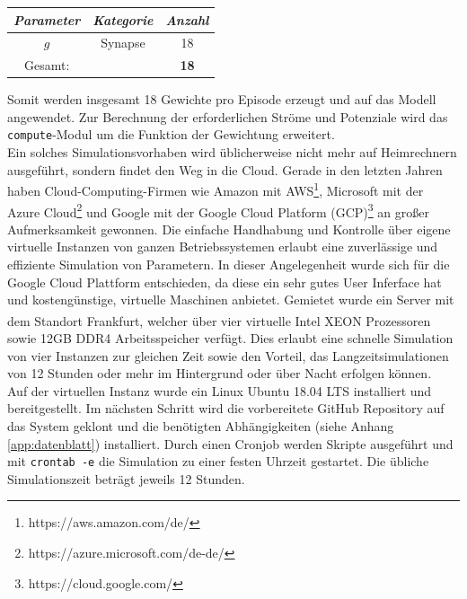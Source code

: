 		\begin{center}
			\begin{tabular}{c@{\hskip 0.5cm}c@{\hskip 0.5cm}c@{\hskip 0.5cm}}    \toprule
				\setlength{\tabcolsep}{50pt}
				\renewcommand{\arraystretch}{1.5}
				\emph{Parameter}	& \emph{Kategorie}  & \emph{Anzahl} \\\midrule
				$g$					& Synapse			& 18			\\\bottomrule
				Gesamt:				&					& \textbf{18}	\\
				\hline
			\end{tabular}
		\end{center}
		Somit werden insgesamt 18 Gewichte pro Episode erzeugt und auf das Modell angewendet. Zur Berechnung der erforderlichen Ströme und Potenziale wird das \texttt{compute}-Modul um die Funktion der Gewichtung erweitert.\\
		Ein solches Simulationsvorhaben wird üblicherweise nicht mehr auf Heimrechnern ausgeführt, sondern findet den Weg in die Cloud. Gerade in den letzten Jahren haben Cloud-Computing-Firmen wie Amazon mit AWS\footnote{https://aws.amazon.com/de/}, Microsoft mit der Azure Cloud\footnote{https://azure.microsoft.com/de-de/} und Google mit der Google Cloud Platform (GCP)\footnote{https://cloud.google.com/} an großer Aufmerksamkeit gewonnen. Die einfache Handhabung und Kontrolle über eigene virtuelle Instanzen von ganzen Betriebssystemen erlaubt eine zuverlässige und effiziente Simulation von Parametern. In dieser Angelegenheit wurde sich für die Google Cloud Plattform entschieden, da diese ein sehr gutes User Inferface hat und kostengünstige, virtuelle Maschinen anbietet. Gemietet wurde ein Server mit dem Standort Frankfurt, welcher über vier virtuelle Intel XEON\textsuperscript{\textregistered} Prozessoren sowie 12GB DDR4 Arbeitsspeicher verfügt. Dies erlaubt eine schnelle Simulation von vier Instanzen zur gleichen Zeit sowie den Vorteil, das Langzeitsimulationen von 12 Stunden oder mehr im Hintergrund oder über Nacht erfolgen können.\\
		Auf der virtuellen Instanz wurde ein Linux Ubuntu 18.04 LTS installiert und bereitgestellt. Im nächsten Schritt wird die vorbereitete GitHub Repository auf das System geklont und die benötigten Abhängigkeiten (siehe Anhang \ref{app:datenblatt}) installiert. Durch einen Cronjob werden Skripte ausgeführt und mit \texttt{crontab -e} die Simulation zu einer festen Uhrzeit gestartet. Die übliche Simulationszeit beträgt jeweils 12 Stunden.\\
